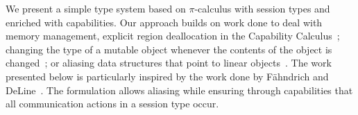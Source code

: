 




We present a simple type system based on $\pi$-calculus with session types and enriched with capabilities. Our approach builds on work done to deal with memory management, explicit region deallocation in the Capability Calculus~\cite{Crary:1999:TMM:292540.292564}; changing the type of a mutable object whenever the contents of the object is changed~\cite{Ahmed:2007:LLL:1365997.1366003}; or aliasing data structures that point to linear objects~\cite{FahndrichM:adofpl1}. The work presented below is particularly inspired by the work done by F\"ahndrich and DeLine~\cite{FahndrichM:adofpl1}. The formulation allows aliasing while ensuring through capabilities that all communication actions in a session type occur.


